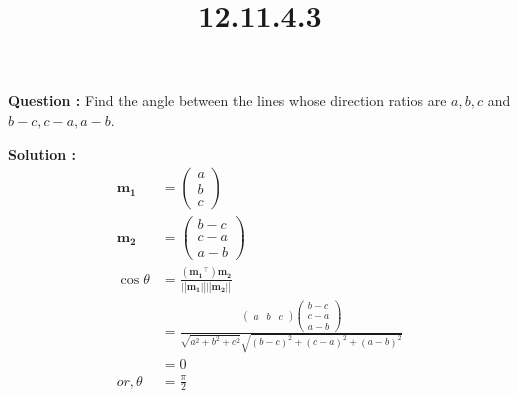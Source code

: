 \documentclass[12pt]{article}
\providecommand{\myvec}[1]{\ensuremath{\begin{pmatrix}#1\end{pmatrix}}}
\providecommand{\brak}[1]{\ensuremath{\left(#1\right)}}
\providecommand{\norm}[1]{\ensuremath{\lvert|#1\rvert|}}
\let\vec\mathbf
\begin{document}
\title{\textbf{12.11.4.3}}
\date{}
\maketitle
\textbf{Question :} Find the angle between the lines whose direction ratios are $a,b,c$ and $b-c,c-a,a-b$.

\textbf{Solution :}
    \begin{align}
    \vec{m _1} &= \myvec{a\\b\\c}\\
    \vec{m_2} &= \myvec{b-c\\c-a\\a-b}\\
    \cos{\theta}&= \frac{\brak{\vec{m_1}^{\top}}\vec{m_2}}{\vec{\norm{m_1}\norm{m_2}}
   } \\
   &=\frac{\myvec{a&b&c}\myvec{b-c\\c-a\\a-b}}{\sqrt{a^2+b^2+c^2}\sqrt{\brak{b-c}^2+\brak{c-a}^2+\brak{a-b}^2}}\\
   &=0\\
   or,\theta&=\frac{\pi}{2}
    \end{align}
\end{document}
